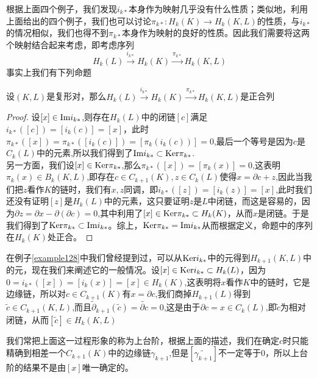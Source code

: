   根据上面四个例子，我们发现$i_{k*}$本身作为映射几乎没有什么性质；类似地，利用上面给出的四个例子，我们也可以讨论$\pi_{k*}:H_{k}(K)\rightarrow H_{k}(K,L)$的性质，与$i_{k*}$的情况相似，我们也得不到$\pi_{k*}$本身作为映射的良好的性质。因此我们需要将这两个映射结合起来考虑，即考虑序列
  \begin{equation}
      H_{k}(L)\xrightarrow{i_{k*}}H_{k}(K)\xrightarrow{\pi_{k*}}H_{k}(K,L)
  \end{equation}
  事实上我们有下列命题
  \begin{proposition}\label{chap3_pro_180}
  设$(K,L)$是复形对，那么$H_{k}(L)\xrightarrow{i_{k*}}H_{k}(K)\xrightarrow{\pi_{k*}}H_{k}(K,L)$是正合列
  \end{proposition}
  \begin{proof}
  设$[x]\in {\rm Im} i_{k*}$,则存在$H_{k}(L)$中的闭链$[c]$满足$i_{k*}([c])=[i_{k}(c)]=[x]$，此时$\pi_{k*}([x])=\pi_{k*}([i_{k}(c)])=[\pi_{k}(i_{k}(c))]=0$,最后一个等号是因为$c$是$C_{k}(L)$中的元素,所以我们得到了${\rm Im} i_{k*}\subset {\rm Ker} \pi_{k*}$.\\
  另一方面，我们设$[x]\in {\rm Ker}\pi_{k*}$,那么$\pi_{k*}([x])=[\pi_{k}(x)]=0$,这表明$\pi_{k}(x)\in B_{k}(K,L)$,即存在$c\in C_{k+1}(K),z\in C_{k}(L)$使得$x=\partial c+z$,因此当我们把$z$看作$K$的链时，我们有$x,z$同调，即$i_{k*}([z])=[i_{k}(z)]=[x]$,此时我们还没有证明$[z]$是$H_{k}(L)$中的元素，这只要证明$z$是$L$中闭链，而这是容易的，因为$\partial z=\partial x-\partial(\partial c)=0$,其中利用了$[x]\in{\rm Ker}\pi_{k*}\subset H_{k}(K)$，从而$x$是闭链。于是我们得到了${\rm Ker} \pi_{k*}\subset {\rm Im} i_{k*}$。综上，${\rm Ker} \pi_{k*}={\rm Im} i_{k*} $从而根据定义，命题中的序列在$H_{k}(K)$处正合。
  \end{proof}
  在例子\eqref{example128}中我们曾经提到过，可以从${\rm Ker} i_{k*}$中的元得到$H_{k+1}(K,L)$中的元，现在我们来阐述它的一般情况。设$[x]\in {\rm Ker} i_{k*}\subset H_{k}(L)$，因为$0=i_{k*}([x])=[i_{k}(x)]=[x]\in H_{k}(K)$,这表明将$x$看作$K$中的链时，它是边缘链，所以对$c\in C_{k+1}(K)$有$x=\partial c$,我们商掉$H_{k+1}(L)$得到$\tilde{c}\in C_{k+1}(K,L)$,而且$\tilde{\partial}_{k+1}(\tilde{c})=\widetilde{\partial c}=0$,这是由于$\partial c=x\in C_{k}(L)$,即$\tilde{c}$为相对闭链，从而$[\tilde{c}]\in H_{k}(K,L)$\\
  \begin{remark}
  我们常把上面这一过程形象的称为上台阶，根据上面的描述，我们在确定$c$时只能精确到相差一个$C_{k+1}(K)$中的边缘链$\gamma_{k+1}$,但是$[\tilde{\gamma_{k+1}}]$不一定等于0，所以上台阶的结果不是由$[x]$唯一确定的。
  \end{remark}

